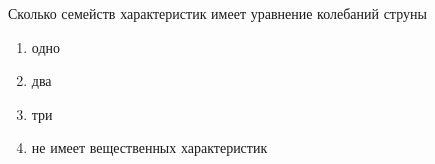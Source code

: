 Сколько семейств характеристик имеет уравнение колебаний струны

\begin{enumerate}[label=\arabic*)]
    \item одно
    \item два
    \item три
    \item не имеет вещественных характеристик
\end{enumerate}

